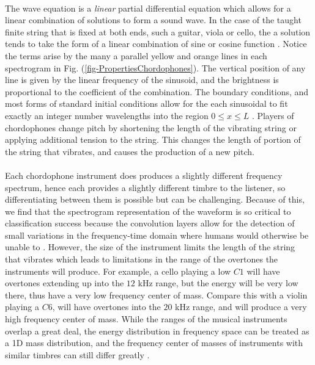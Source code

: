 \documentclass[12pt,letterpaper]{article}
\begin{document}
\paragraph*{}The wave equation is a \textit{linear} partial differential equation which allows for a linear combination of solutions to form a sound wave. In the case of the taught finite string that is fixed at both ends, such a guitar, viola or cello, the a solution tends to take the form of a linear combination of sine or cosine function \cite{Hunter, Taylor, White}. Notice the terms arise by the many a parallel yellow and orange lines in each spectrogram in Fig. (\ref{fig-PropertiesChordophones}). The vertical position of any line is given by the linear frequency of the sinusoid, and the brightness is proportional to the coefficient of the combination. The boundary conditions, and most forms of standard initial conditions allow for the each sinusoidal to fit exactly an integer number wavelengths into the region $0 \leq x \leq L$ \cite{Haberman,Hunter}. Players of chordophones change pitch by shortening the length of the vibrating string or applying additional tension to the string. This changes the length of portion of the string that vibrates, and causes the production of a new pitch.

\paragraph*{}Each chordophone instrument does produces a slightly different frequency spectrum, hence each provides a slightly different timbre to the listener, so differentiating between them is possible but can be challenging. Because of this, we find that the spectrogram representation of the waveform is so critical to classification success because the convolution layers allow for the detection of small variations in the frequency-time domain where humans would otherwise be unable to \cite{Loy,Virtanen}. However, the size of the instrument limits the length of the string that vibrates which leads to limitations in the range of the overtones the instruments will produce. For example, a cello playing a low $C1$ will have overtones extending up into the $12$ kHz range, but the energy will be very low there, thus have a very low frequency center of mass. Compare this with a violin playing a $C6$, will have overtones into the $20$ kHz range, and will produce a very high frequency center of mass. While the ranges of the musical instruments overlap a great deal, the energy distribution in frequency space can be treated as a 1D mass distribution, and the frequency center of masses of instruments with similar timbres can still differ greatly \cite{Serizel}.
\end{document}
